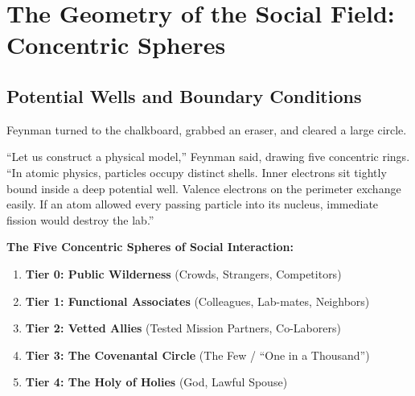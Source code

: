 \documentclass[11pt]{report}
\begin{document}
\chapter{The Geometry of the Social Field: Concentric Spheres}

\section{Potential Wells and Boundary Conditions}
Feynman turned to the chalkboard, grabbed an eraser, and cleared a large circle.

``Let us construct a physical model,'' Feynman said, drawing five concentric rings. ``In atomic physics, particles occupy distinct shells. Inner electrons sit tightly bound inside a deep potential well. Valence electrons on the perimeter exchange easily. If an atom allowed every passing particle into its nucleus, immediate fission would destroy the lab.''

\begin{blackboard}
\textbf{The Five Concentric Spheres of Social Interaction:}
\begin{enumerate}
    \item \textbf{Tier 0: Public Wilderness} (Crowds, Strangers, Competitors)
    \item \textbf{Tier 1: Functional Associates} (Colleagues, Lab-mates, Neighbors)
    \item \textbf{Tier 2: Vetted Allies} (Tested Mission Partners, Co-Laborers)
    \item \textbf{Tier 3: The Covenantal Circle} (The Few / ``One in a Thousand'')
    \item \textbf{Tier 4: The Holy of Holies} (God, Lawful Spouse)
\end{enumerate}
\end{blackboard}
\end{document}
